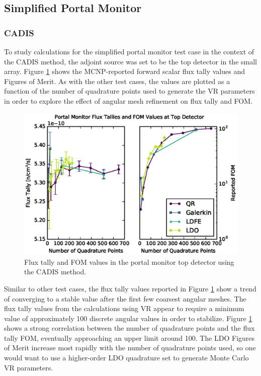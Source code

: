 \documentclass{article} %
\begin{document}
\subsection{Simplified Portal Monitor}

\subsubsection{CADIS}

To study calculations for the simplified portal monitor test case in the
context of the CADIS method, the adjoint source was set to be the top detector
in the small array. Figure \ref{cargo-cadis} shows the MCNP-reported forward
scalar flux tally
values and Figures of Merit. As with the other test cases, the values are
plotted as a function of the number of quadrature points used to generate the
VR parameters in order to explore the effect of angular mesh refinement on
flux tally and FOM.

\begin{figure}[!htb]
\centering
\includegraphics[max height=0.445\textheight]{portal-cadis.eps}
\caption{Flux tally and FOM values in the portal monitor top detector using
         the CADIS method.}
\label{cargo-cadis}
\end{figure}

Similar to other test cases, the flux tally values reported in Figure 
\ref{cargo-cadis} show a trend of converging to a stable value after the
first few coarsest angular meshes. The flux tally values from the
calculations using VR appear to require a minimum value of approximately 100
discrete angular values in order to stabilize. Figure \ref{cargo-cadis}
shows a strong correlation between the number of quadrature points and the
flux tally FOM, eventually approaching an upper limit around 100. The LDO
Figures of Merit increase most rapidly with the number of quadrature points
used, so one would want to use a higher-order LDO quadrature set to generate
Monte Carlo VR parameters.
\end{document}
